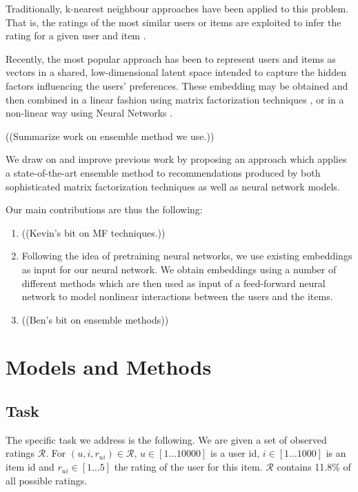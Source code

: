 \documentclass[10pt,conference,compsocconf]{IEEEtran}
\begin{document}
    
Traditionally, k-nearest neighbour approaches have been applied to this problem. That is, the ratings of the most similar users or items are exploited to infer the rating for a given user and item \cite{sarwar2001item}.

Recently, the most popular approach has been to represent users and items  as vectors in a shared, low-dimensional latent space intended to capture the hidden factors influencing the users' preferences. These embedding may be obtained and then combined in a linear fashion using matrix factorization techniques \cite{koren2009matrix}, or in a non-linear way using Neural Networks
\cite{he2017neural}.


((Summarize work on ensemble method we use.))



We draw on and improve previous work by proposing an approach which applies a state-of-the-art ensemble method to recommendations produced by both sophisticated matrix factorization techniques as well as neural network models.

Our main contributions are thus the following: 
\begin{enumerate}
    \item ((Kevin's bit on MF techniques.))
    \item Following the idea of pretraining neural networks, we use existing embeddings as input for our neural network. We obtain embeddings using a number of different methods which are then used as input of a feed-forward neural network to model nonlinear interactions between the users and the items. 
    \item ((Ben's bit on ensemble methods))
\end{enumerate}



\section{Models and Methods}
\label{sec:methods}

\subsection{Task}

The specific task we address is the following.
We are given a set of observed ratings $\mathcal{R}$. For $(u, i, r_{ui}) \in \mathcal{R}$, $u \in [1\dots10000]$ is a user id, $i \in [1\dots1000]$  is an item id and $r_{ui} \in [1\dots5]$ the rating of the user for this item. $\mathcal{R}$ contains 11.8\% of all possible ratings. 
\end{document}
